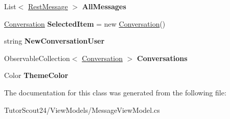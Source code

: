\begin{DoxyCompactItemize}
List$<$ \mbox{\hyperlink{class_tutor_scout24_1_1_models_1_1_chat_1_1_rest_message}{Rest\+Message}} $>$ {\bfseries All\+Messages}
\item 
\mbox{\label{class_tutor_scout24_1_1_view_models_1_1_message_view_model_aa333f7a9b91caa6a2dce073d0119596d}} 
\mbox{\hyperlink{class_tutor_scout24_1_1_models_1_1_chat_1_1_conversation}{Conversation}} {\bfseries Selected\+Item} = new \mbox{\hyperlink{class_tutor_scout24_1_1_models_1_1_chat_1_1_conversation}{Conversation}}()
\item 
\mbox{\label{class_tutor_scout24_1_1_view_models_1_1_message_view_model_a9780402ef59416476a7fcfdd031461a9}} 
string {\bfseries New\+Conversation\+User}
\item 
\mbox{\label{class_tutor_scout24_1_1_view_models_1_1_message_view_model_aae41dcd09094386df8b712a62f4a18ca}} 
Observable\+Collection$<$ \mbox{\hyperlink{class_tutor_scout24_1_1_models_1_1_chat_1_1_conversation}{Conversation}} $>$ {\bfseries Conversations}
\item 
\mbox{\label{class_tutor_scout24_1_1_view_models_1_1_message_view_model_a0f757e9800a7272add8ee681abb92bb9}} 
Color {\bfseries Theme\+Color}
\end{DoxyCompactItemize}


The documentation for this class was generated from the following file\+:\begin{DoxyCompactItemize}
\item 
Tutor\+Scout24/\+View\+Models/Message\+View\+Model.\+cs\end{DoxyCompactItemize}
